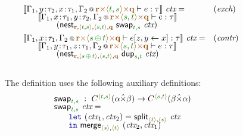\begin{figure*}[!t]
\begin{equation*}
\begin{array}{ll}
\\[0.4em]
\sem{\coctx{\Gamma_1,y\!:\!\tau_2,x\!:\!\tau_1,\Gamma_2}{\aclrd{\textbf{r}} 
        \atimes \alift{\cclrd{t},\cclrd{s}} \atimes \aclrd{\textbf{q}}} \vdash e : \tau}~\ctx = & (\emph{exch})\\[-0.25em]
  \hspace{1.75em}  \sem{\coctx{\Gamma_1,x\!:\!\tau_1,y\!:\!\tau_2,\Gamma_2}
     {\aclrd{\textbf{r}} \atimes \alift{\cclrd{s},\cclrd{t}} \atimes \aclrd{\textbf{q}}} \vdash e : \tau}\\[-0.25em]
  \hspace{4em}  (\ident{nest}_{\aclrd{\textbf{r}}, \alift{\cclrd{t},\cclrd{s}}, 
     \alift{\cclrd{s},\cclrd{t}}, \aclrd{\textbf{q}}}~\ident{swap}_{\cclrd{t},\cclrd{s}}~\ctx)
\\[0.4em]
\sem{\coctx{\Gamma_1,x\!:\!\tau_1,\Gamma_2}{\aclrd{\textbf{r}} 
        \atimes \alift{\cclrd{s} \,\cpar\, \cclrd{t}} \atimes \aclrd{\textbf{q}}} \vdash \subst{e}{z,y}{x} : \tau}~\ctx = & (\emph{contr})\\[-0.25em]
  \hspace{1.75em}  \sem{\coctx{\Gamma_1,y\!:\!\tau_1,z\!:\!\tau_1,\Gamma_2}
      {\aclrd{\textbf{r}} \atimes \alift{\cclrd{s},\cclrd{t}} \atimes \aclrd{\textbf{q}}} \vdash e : \tau}\\[-0.25em]
  \hspace{4em}  (\ident{nest}_{\aclrd{\textbf{r}}, \alift{\cclrd{s}\,\cpar\,\cclrd{t}}, 
      \alift{\cclrd{s},\cclrd{t}}, \aclrd{\textbf{q}}}~\ident{dup}_{\cclrd{s}, \cclrd{t}}~\ctx)
\end{array}
\end{equation*}
\\[0.0em]
{\small The definition uses the following auxiliary definitions:}
\begin{equation*}
\hspace{-2em}
\begin{array}{l}
 \ident{swap}_{\cclrd{t},\cclrd{s}} ~:~ 
  \ctyp{\alift{\cclrd{t}, \cclrd{s}}}{(\alpha \xtimes \beta)} \rightarrow \ctyp{\alift{\cclrd{s}, \cclrd{t}}}{(\beta \xtimes \alpha)} \\[-0.25em]
\ident{swap}_{\cclrd{t},\cclrd{s}}~\ctx = \\
  \hspace{1.75em} \kvd{let}~(\ctx_1, \ctx_2) = \ident{split}_{\alift{\cclrd{t}}, \alift{\cclrd{s}}}~\ctx \\[-0.25em]
  \hspace{1.75em} \kvd{in}~\ident{merge}_{\alift{\cclrd{s}}, \alift{\cclrd{t}}}~(\ctx_2, \ctx_1)

\end{array}
\end{equation*}
\end{figure*}
